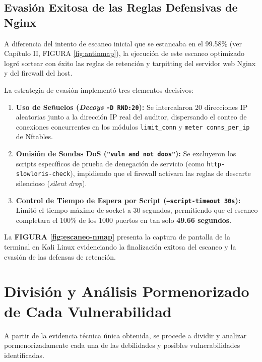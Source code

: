 \subsection{Evasión Exitosa de las Reglas Defensivas de Nginx}

A diferencia del intento de escaneo inicial que se estancaba en el 99.58\% (ver Capítulo II, FIGURA \ref{fig:antinmap}), la ejecución de este escaneo optimizado logró sortear con éxito las reglas de retención y tarpitting del servidor web Nginx y del firewall del host.

La estrategia de evasión implementó tres elementos decisivos:
\begin{enumerate}
  \item \textbf{Uso de Señuelos (\textit{Decoys} \texttt{-D RND:20}):} Se intercalaron 20 direcciones IP aleatorias junto a la dirección IP real del auditor, dispersando el conteo de conexiones concurrentes en los módulos \texttt{limit\_conn} y \texttt{meter conns\_per\_ip} de Nftables.
  \item \textbf{Omisión de Sondas DoS (\texttt{"vuln and not doos"}):} Se excluyeron los scripts específicos de prueba de denegación de servicio (como \texttt{http-slowloris-check}), impidiendo que el firewall activara las reglas de descarte silencioso (\textit{silent drop}).
  \item \textbf{Control de Tiempo de Espera por Script (\texttt{--script-timeout 30s}):} Limitó el tiempo máximo de socket a 30 segundos, permitiendo que el escaneo completara el 100\% de los 1000 puertos en tan solo \textbf{49.66 segundos}.
\end{enumerate}

La \textbf{FIGURA \ref{fig:escaneo-nmap}} presenta la captura de pantalla de la terminal en Kali Linux evidenciando la finalización exitosa del escaneo y la evasión de las defensas de retención.


\section{División y Análisis Pormenorizado de Cada Vulnerabilidad}

A partir de la evidencia técnica única obtenida, se procede a dividir y analizar pormenorizadamente cada una de las debilidades y posibles vulnerabilidades identificadas.

